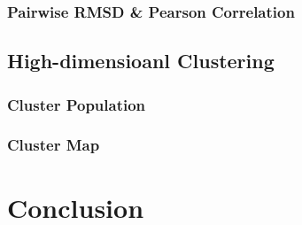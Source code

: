 \documentclass[a4paper]{article}
\begin{document}
\subsubsection{Pairwise RMSD \& Pearson Correlation}

\subsection{High-dimensioanl Clustering}

\subsubsection{Cluster Population}

\subsubsection{Cluster Map}

\section{Conclusion}


\pagebreak


\end{document}
